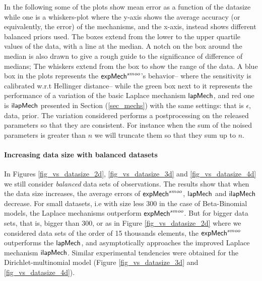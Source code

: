 \documentclass{article}
\begin{document}
\noindent In the following some of the plots show
mean error as a function of the datasize while one
is a whiskers-plot where the y-axis shows the average
accuracy (or equivalently, the error) of the mechanisms, and the x-axis, instead shows
different balanced priors used. The boxes extend from the lower to the upper quartile values
of the data, with a line at the median. A notch on the box around the
median is also drawn to give a rough guide to the significance of
difference of medians; The whiskers extend from the box to show the
range of the data. A blue box in the plots represents the $\mathsf{expMech}^{smoo}$'s behavior-- where the sensitivity is calibrated
w.r.t Hellinger distance-- while the green box next to
it represents the performance of a variation of the basic Laplace
mechanism $\mathsf{lapMech}$, and red one is $\mathsf{ilapMech}$ presented in Section (\ref{sec_mechs}) with the same
settings: that is $\epsilon$, data, prior. The variation
considered performs a postprocessing on the released parameters so
that they are consistent. For instance when the sum of the noised
parameters is greater than $n$ we will truncate them so that they sum
up to $n$.

\paragraph{Increasing data size with balanced datasets}
\label{subsubsec_vs_datasize}


\begin{figure}[ht]
\begin{center}
\centering
{}

\end{center}
\end{figure}

In Figures \ref{fig_vs_datasize_2d}, \ref{fig_vs_datasize_3d} and \ref{fig_vs_datasize_4d} we still consider \emph{balanced} data sets
of observations. The results show that when the data size increases, the average errors of
$\mathsf{expMech}^{smoo}$, $\mathsf{lapMech}$ and $\mathsf{ilapMech}$ decrease. For small datasets,
i.e with size less $300$ in the case of Beta-Binomial models, the Laplace mechanisms outperform $\mathsf{expMech}^{smoo}$.
But for bigger data sets, that is, bigger than $300$, or as in Figure \ref{fig_vs_datasize_2d} where
we considered data sets of the order of 15 thousands elements,
the $\mathsf{expMech}^{smoo}$ outperforms the $\mathsf{lapMech}$, and asymptotically approaches the improved Laplace mechanism $\mathsf{ilapMech}$.
Similar experimental tendencies were obtained for the Dirichlet-multinomial model (Figure \ref{fig_vs_datasize_3d} and \ref{fig_vs_datasize_4d}).
\end{document}
